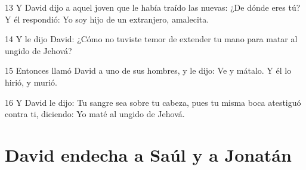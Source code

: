 \par 13 Y David dijo a aquel joven que le había traído las nuevas: ¿De dónde eres tú? Y él respondió: Yo soy hijo de un extranjero, amalecita.
\par 14 Y le dijo David: ¿Cómo no tuviste temor de extender tu mano para matar al ungido de Jehová?
\par 15 Entonces llamó David a uno de sus hombres, y le dijo: Ve y mátalo. Y él lo hirió, y murió.
\par 16 Y David le dijo: Tu sangre sea sobre tu cabeza, pues tu misma boca atestiguó contra ti, diciendo: Yo maté al ungido de Jehová.

\section*{David endecha a Saúl y a Jonatán}

